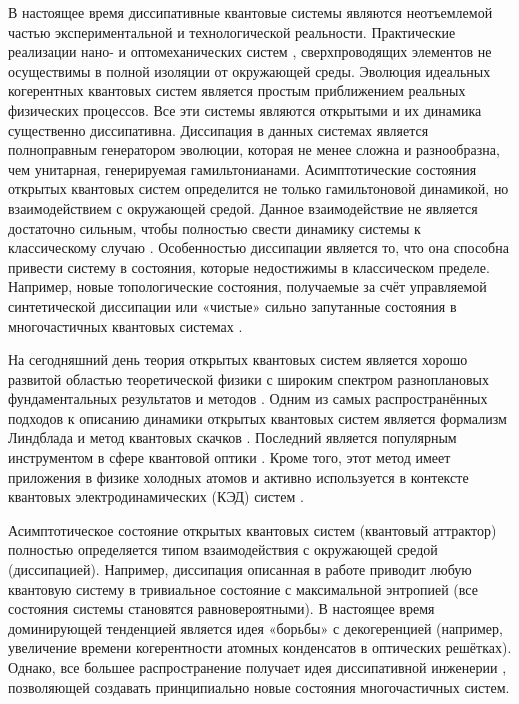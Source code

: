 
{\actuality} 
В настоящее время диссипативные квантовые системы являются неотъемлемой частью экспериментальной и технологической реальности.
Практические реализации нано- \autocite{Poot2012} и оптомеханических систем \autocite{Aspelmeyer2014}, сверхпроводящих элементов \autocite{Clarke2008} не осуществимы в полной изоляции от окружающей среды.
Эволюция идеальных когерентных квантовых систем является простым приближением реальных физических процессов. 
Все эти системы являются открытыми и их динамика существенно диссипативна.
Диссипация в данных системах является полноправным генератором эволюции, которая не менее сложна и разнообразна, чем унитарная, генерируемая гамильтонианами.
Асимптотические состояния открытых квантовых систем определится не только гамильтоновой динамикой, но взаимодействием с окружающей средой.
Данное взаимодействие не является достаточно сильным, чтобы полностью свести динамику системы к классическому случаю \autocite{Breuer2007}.
Особенностью диссипации является то, что она способна привести систему в состояния, которые недостижимы в классическом пределе.
Например, новые топологические состояния, получаемые за счёт управляемой синтетической диссипации \autocite{Diehl2011} или «чистые» сильно запутанные состояния в многочастичных квантовых системах \autocite{Kraus2008}.

На сегодняшний день теория открытых квантовых систем является хорошо развитой областью теоретической физики с широким спектром разноплановых фундаментальных результатов и методов \autocite{Breuer2007}.
Одним из самых распространённых подходов к описанию динамики открытых квантовых систем является формализм Линдблада \autocite{Lindblad1976, Gorini1976} и метод квантовых скачков \autocite{Dalibard1992, Dum1992, Plenio1998}. Последний является популярным инструментом в сфере квантовой оптики \autocite{Carmichael1993}.
Кроме того, этот метод имеет приложения в физике холодных атомов \autocite{Diehl2011, Diehl2008, Marcuzzi2014} и активно используется в контексте квантовых электродинамических (КЭД) систем \autocite{Imamoglu1999, Walther2006, Arakawa2015}.

Асимптотическое состояние открытых квантовых систем (квантовый аттрактор) полностью определяется типом взаимодействия с окружающей средой (диссипацией). 
Например, диссипация описанная в работе \autocite{Poletti2013} приводит любую квантовую систему в тривиальное состояние с максимальной энтропией (все состояния системы становятся равновероятными).
В настоящее время доминирующей тенденцией является идея «борьбы» с декогеренцией (например, увеличение времени когерентности атомных конденсатов в оптических решётках). Однако, все большее распространение получает идея диссипативной инженерии \autocite{Diehl2008}, позволяющей создавать принципиально новые состояния многочастичных систем.

